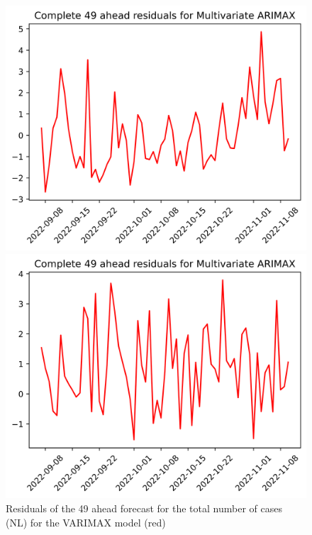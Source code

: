 \begin{figure}

\begin{minipage}{.32\textwidth}
  \centering
  \includegraphics[width=\linewidth]{pics/49_ah/49_ahead_errors_Multivariate ARIMAX.png}
  \caption{Residuals of the 49 ahead forecast for the total number of cases (NL) for the VARIMAX model (red)}
  \label{fig:tot_cases_error_49_VARIMAX}
\end{minipage}
\begin{minipage}{.32\textwidth}
  \centering
  \includegraphics[width=\linewidth]{pics/49_ah/DE_49_ahead_errors_Multivariate ARIMAX.png}

\end{minipage}
\end{figure}
